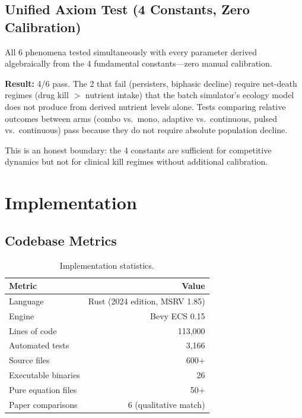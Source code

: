 \documentclass[11pt,a4paper]{article}
\begin{document}
\subsection{Unified Axiom Test (4 Constants, Zero Calibration)}

All 6 phenomena tested simultaneously with every parameter derived
algebraically from the 4 fundamental constants---zero manual calibration.

\textbf{Result:} 4/6 pass. The 2 that fail (persisters, biphasic decline)
require net-death regimes (drug kill $>$ nutrient intake) that the
batch simulator's ecology model does not produce from derived nutrient
levels alone. Tests comparing relative outcomes between arms
(combo vs.\ mono, adaptive vs.\ continuous, pulsed vs.\ continuous)
pass because they do not require absolute population decline.

This is an honest boundary: the 4 constants are sufficient for
competitive dynamics but not for clinical kill regimes without
additional calibration.

\section{Implementation}
\label{sec:implementation}

\subsection{Codebase Metrics}

\begin{table}[h]
\centering
\caption{Implementation statistics.}
\begin{tabular}{@{}lr@{}}
\toprule
\textbf{Metric} & \textbf{Value} \\
\midrule
Language & Rust (2024 edition, MSRV 1.85) \\
Engine & Bevy ECS 0.15 \\
Lines of code & 113{,}000 \\
Automated tests & 3{,}166 \\
Source files & 600+ \\
Executable binaries & 26 \\
Pure equation files & 50+ \\
Paper comparisons & 6 (qualitative match) \\
\bottomrule
\end{tabular}
\end{table}
\end{document}

